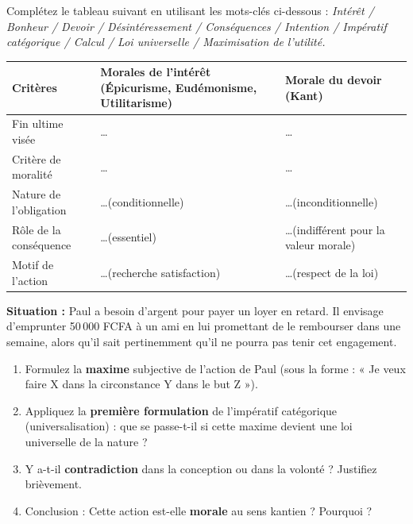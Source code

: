 \documentclass[11pt]{article}
\begin{document}
\begin{exercice}
Complétez le tableau suivant en utilisant les mots-clés ci-dessous :
\textit{Intérêt / Bonheur / Devoir / Désintéressement / Conséquences / Intention / Impératif catégorique / Calcul / Loi universelle / Maximisation de l'utilité.}

\begin{tabular}{|p{3.5cm}|p{5.5cm}|p{5.5cm}|}
\hline
\textbf{Critères} & \textbf{Morales de l'intérêt (Épicurisme, Eudémonisme, Utilitarisme)} & \textbf{Morale du devoir (Kant)} \\ \hline
Fin ultime visée & \ldots & \ldots \\ \hline
Critère de moralité & \ldots & \ldots \\ \hline
Nature de l'obligation & \ldots (conditionnelle) & \ldots (inconditionnelle) \\ \hline
Rôle de la conséquence & \ldots (essentiel) & \ldots (indifférent pour la valeur morale) \\ \hline
Motif de l'action & \ldots (recherche satisfaction) & \ldots (respect de la loi) \\ \hline
\end{tabular}
\end{exercice}

\begin{exercice}
\textbf{Situation :} Paul a besoin d'argent pour payer un loyer en retard. Il envisage d'emprunter 50\,000 FCFA à un ami en lui promettant de le rembourser dans une semaine, alors qu'il sait pertinemment qu'il ne pourra pas tenir cet engagement.
\begin{enumerate}
    \item Formulez la \textbf{maxime} subjective de l'action de Paul (sous la forme : « Je veux faire X dans la circonstance Y dans le but Z »).
    \item Appliquez la \textbf{première formulation} de l'impératif catégorique (universalisation) : que se passe-t-il si cette maxime devient une loi universelle de la nature ?
    \item Y a-t-il \textbf{contradiction} dans la conception ou dans la volonté ? Justifiez brièvement.
    \item Conclusion : Cette action est-elle \textbf{morale} au sens kantien ? Pourquoi ?
\end{enumerate}
\end{exercice}
\end{document}
